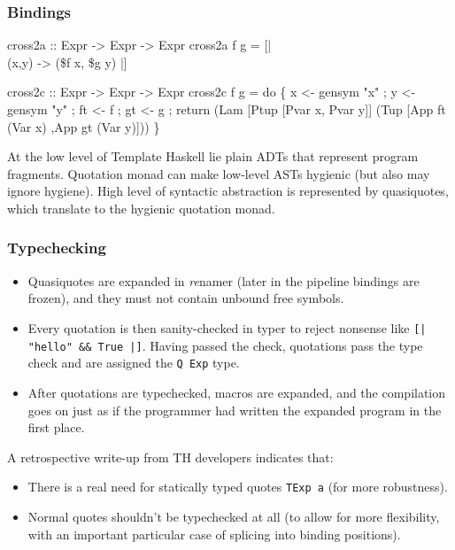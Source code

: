 \documentclass[hyperref={bookmarks=false}]{beamer}
\begin{document}
\begin{frame}[fragile]

\end{frame}

\begin{frame}[fragile]
\frametitle{Bindings}

\begin{lstlistinglike}
\begin{semiverbatim}
cross2a :: Expr -> Expr -> Expr
cross2a f g = [| \\(x,y) -> (\$f x, \$g y) |]

cross2c :: Expr -> Expr -> Expr
cross2c f g =
  do \{ x <- gensym "x"
     ; y <- gensym "y"
     ; ft <- f
     ; gt <- g
     ; return (Lam [Ptup [Pvar x, Pvar y]]
                   (Tup  [App ft (Var x)
                         ,App gt (Var y)]))
     \}
\end{semiverbatim}
\end{lstlistinglike}

At the low level of Template Haskell lie plain ADTs that represent program fragments.
Quotation monad can make low-level ASTs hygienic (but also may ignore hygiene).
High level of syntactic abstraction is represented by quasiquotes, which translate to
the hygienic quotation monad.
\end{frame}

\begin{frame}[fragile]
\frametitle{Typechecking}

\begin{itemize}
\item Quasiquotes are expanded in \emph{re}namer (later in the pipeline bindings are frozen),
and they must not contain unbound free symbols.
\item Every quotation is then sanity-checked in typer to reject nonsense like \texttt{[| "hello" \&\& True |]}.
Having passed the check, quotations pass the type check and are assigned the \texttt{Q Exp} type.
\item After quotations are typechecked, macros are expanded, and the compilation goes on just
as if the programmer had written the expanded program in the first place.
\end{itemize}

A retrospective write-up from TH developers indicates that:
\begin{itemize}
\item There is a real need for statically typed quotes \texttt{TExp a} (for more robustness).
\item Normal quotes shouldn't be typechecked at all (to allow for more flexibility, with an important
particular case of splicing into binding positions).
\end{itemize}
\end{frame}
\end{document}
